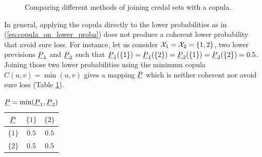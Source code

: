 \begin{figure}[!hb]
    \centering
    \caption{Comparing different methods of joining credal sets with a copula.}
    \label{fig:meaning_computation}
\end{figure}

In general, applying the copula directly to the lower probabilities as in (\ref{eq:copula_on_lower_proba}) does not produce a coherent lower probability that avoid sure loss. For instance, let us consider ${\mathcal{X}}_1 = {\mathcal{X}}_2 = \{1, 2\}$, two lower previsions ${\underline{P}}_1$ and ${\underline{P}}_2$ such that ${\underline{P}}_1(\{1\}) = {\underline{P}}_1(\{2\}) = {\underline{P}}_2(\{1\}) = {\underline{P}}_2(\{2\}) = 0.5$. Joining those two lower probabilities using the minimum copula $C(u,v)=\min(u,v)$ gives a mapping ${\underline{P}}$ which is neither coherent nor avoid sure loss (Table \ref{tab:non_coherent_lower}).

\begin{table}[!ht]
    \centering
    \begin{tabular}{|c||c|c|}
        \hline
        \hspace{0.2cm} ${\underline{P}}$ \hspace{0.2cm} & \hspace{0.2cm} $\{1\}$ \hspace{0.2cm} & \hspace{0.2cm} $\{2\}$ \hspace{0.2cm} \\\hline\hline
        $\{1\}$ & $0.5$ & $0.5$ \\\hline
        $\{2\}$ & $0.5$ & $0.5$\\
        \hline
        \end{tabular}
        \caption{${\underline{P}} = \min({\underline{P}}_1, {\underline{P}}_2)$}
        \label{tab:non_coherent_lower}
\end{table}


